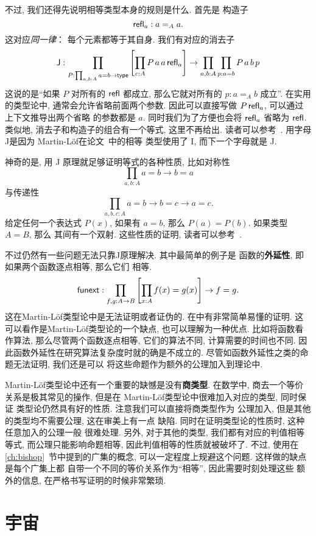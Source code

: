 不过, 我们还得先说明相等类型本身的规则是什么. 首先是
构造子
\[\textsf{refl}_a : a =_A a.\]
这对应\emph{同一律}： 每个元素都等于其自身.
我们有对应的消去子
\[\textsf{J} :
\prod_{P : \prod_{a,b:A} a = b \to \textsf{type}}
\left[\prod_{c : A} P\,a\,a\,\textsf{refl}_a\right] \to \prod_{a,b:A}\prod_{p : a=b} P\,a\,b\,p\]
这说的是“如果 \(P\) 对所有的 \(\textsf{refl}\) 都成立,
那么它就对所有的 \(p : a=_A b\) 成立”.
在实用的类型论中, 通常会允许省略前面两个参数. 因此可以直接写做
\(P\,\textsf{refl}_a\), 可以通过上下文推导出两个省略
的参数都是 \(a\). 同时我们为了方便也会将
\(\textsf{refl}_a\) 省略为 \(\textsf{refl}\).
类似地, 消去子和构造子的组合有一个等式, 这里不再给出.
读者可以参考~\cite{ufp:2013:hottbook}. 用字母J是因为
Martin-L\"of在论文~\cite{martinlof:1984:J}中的相等
类型使用了 I, 而下一个字母就是 J.

神奇的是, 用 J 原理就足够证明等式的各种性质, 比如对称性
\[\prod_{a,b:A} a = b \to b = a\]
与传递性
\[\prod_{a,b,c:A} a=b \to b=c \to a=c.\]
给定任何一个表达式 \(P(x)\), 如果有 \(a=b\),
那么 \(P(a) = P(b)\). 如果类型 \(A = B\), 那么
其间有一个双射. 这些性质的证明, 读者可以参考~\cite[\S1.12]{ufp:2013:hottbook}.

不过仍然有一些问题无法只靠J原理解决. 其中最简单的例子是
函数的\textbf{外延性}, 即如果两个函数逐点相等, 那么它们
相等.
\[\textsf{funext} : \prod_{f,g : A \to B}
\left[\prod_{x : A} f(x) = g(x)\right] \to f = g.\]
这在Martin-L\"of类型论中是无法证明或者证伪的.
在\cite{boulier:2017:syntacticmodel}中有非常简单易懂的证明.
这可以看作是Martin-L\"of类型论的一个缺点, 也可以理解为一种优点.
比如将函数看作算法, 那么尽管两个函数逐点相等, 它们的算法不同,
计算需要的时间也不同. 因此函数外延性在研究算法复杂度时就的确是不成立的.
尽管如函数外延性之类的命题无法证明, 我们还是可以
将这些命题作为额外的公理加入到理论中.

Martin-L\"of类型论中还有一个重要的缺憾是没有\textbf{商类型}.
在数学中, 商去一个等价关系是极其常见的操作, 但是在
Martin-L\"of类型论中很难加入对应的类型, 同时保证
类型论仍然具有好的性质. 注意我们可以直接将商类型作为
公理加入, 但是其他的类型均不需要公理, 这在审美上有一点
缺陷. 同时在证明类型论的性质时, 这种任意加入的公理一般
很难处理. 另外, 对于其他的类型, 我们都有对应的判值相等等式,
而公理只能影响命题相等, 因此判值相等的性质就被破坏了.
不过, 使用在 \ref{ch:bishop}~节中提到的广集的概念,
可以一定程度上规避这个问题. 这样做的缺点是每个广集上都
自带一个不同的等价关系作为“相等”, 因此需要时刻处理这些
额外的信息, 在严格书写证明的时候非常繁琐.

\section{宇宙}

